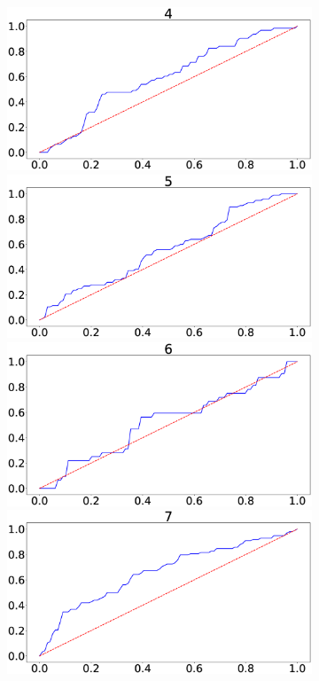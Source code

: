 \documentclass[journal]{IEEEtran}
\providecommand{\DIFaddtex}[1]{{\protect\color{blue}\uwave{#1}}} %
\providecommand{\DIFaddFL}[1]{\DIFadd{#1}} %
\providecommand{\DIFadd}[1]{\texorpdfstring{\DIFaddtex{#1}}{#1}} %
\begin{document}
{{\begin{figure}[h!]
\begin{subfigure}{0.5\textwidth}
{ }\includegraphics[scale=0.09]{revisedimages/roc_4.eps} \\
 \centering
  \includegraphics[scale=0.09]{revisedimages/roc_5.eps}   \DIFaddFL{\hspace{-1.5em}
  }\includegraphics[scale=0.09]{revisedimages/roc_6.eps} \\
  \centering
  \includegraphics[scale=0.09]{revisedimages/roc_7.eps}    \DIFaddFL{\hspace{-1.5em}
}
\end{subfigure}
\end{figure}}}
\end{document}
